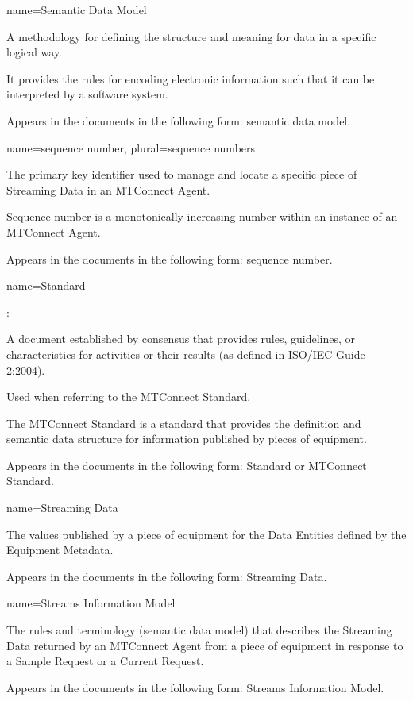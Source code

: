 {
  name={Semantic Data Model}
}
{
	A methodology for defining the structure and meaning for data in a specific logical way.  

	It provides the rules for encoding electronic information such that it can be interpreted by a software system.  

	Appears in the documents in the following form: semantic data model.
}


{
  name={sequence number},
  plural={sequence numbers}
}
{
	The primary key identifier used to manage and locate a specific piece of Streaming Data in an MTConnect Agent.

	Sequence number is a monotonically increasing number within an instance of an MTConnect Agent.

	Appears in the documents in the following form: sequence number.
}


{
  name={Standard}
}
{
	:

	A document established by consensus that provides rules, guidelines, or characteristics for activities or their results (as defined in ISO/IEC Guide 2:2004).

	Used when referring to the MTConnect Standard. 

	The MTConnect Standard is a standard that provides the definition and semantic data structure for information published by pieces of equipment.

	Appears in the documents in the following form: Standard or MTConnect Standard.
}


{
  name={Streaming Data}
}
{
	The values published by a piece of equipment for the Data Entities defined by the Equipment Metadata.

	Appears in the documents in the following form: Streaming Data.
}


{
  name={Streams Information Model}
}
{
	The rules and terminology (semantic data model) that describes the Streaming Data returned by an MTConnect Agent from a piece of equipment in response to a Sample Request or a Current Request.

	Appears in the documents in the following form: Streams Information Model.
}


